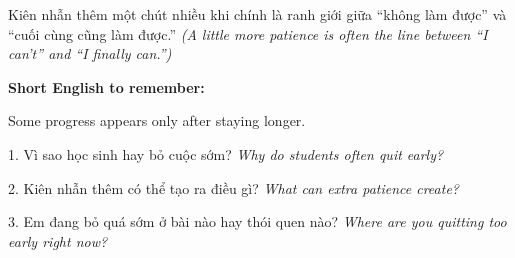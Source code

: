 \begin{baihoc}
Kiên nhẫn thêm một chút nhiều khi chính là ranh giới giữa ``không làm được'' và ``cuối cùng cũng làm được.''
\textit{(A little more patience is often the line between ``I can't'' and ``I finally can.'')}
\end{baihoc}

\begin{ghinhoanh}
\textbf{Short English to remember:}

Some progress appears only after staying longer.

\end{ghinhoanh}

\begin{tuhocnhanh}
1. Vì sao học sinh hay bỏ cuộc sớm? \textit{Why do students often quit early?}

2. Kiên nhẫn thêm có thể tạo ra điều gì? \textit{What can extra patience create?}

3. Em đang bỏ quá sớm ở bài nào hay thói quen nào? \textit{Where are you quitting too early right now?}
\end{tuhocnhanh}
\ngancach